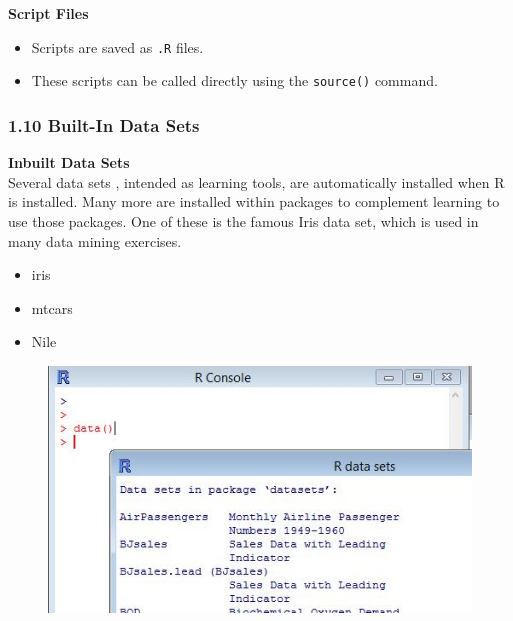 \documentclass{beamer}
\begin{document}
 \begin{frame}
 	
 	\textbf{Script Files}
 	\begin{itemize}
 		\item Scripts are saved as \texttt{.R} files. 
 		\item These scripts can be called directly using the \texttt{source()} command.
 	\end{itemize}
 \end{frame}
 \begin{frame}
 	\frametitle{1.10 Built-In Data Sets}
 	\textbf{Inbuilt Data Sets}\\
 	Several data sets , intended as learning tools, are automatically installed when R is installed.
 	Many more are installed within packages to complement learning to use those packages. One
 	of these is the famous Iris data set, which is used in many data mining exercises.
 	
 	\begin{itemize}
 		\item iris
 		\item mtcars
 		\item Nile
 	\end{itemize}
 	
 	
 \end{frame}
 \begin{frame}
 	\begin{figure}
 		\centering
 		\includegraphics[width=0.7\linewidth]{images/Rdatasets}        
 	\end{figure}
 \end{frame}   
\end{document}
